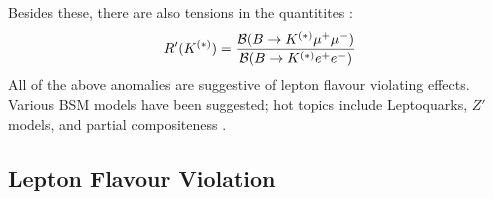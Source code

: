 \\ \\
Besides these, there are also tensions in the quantitites \cite{Altmannshofer:2017yso}:
\begin{align}
	R'(K^{(*)}) = {\mathcal{B}( B\to K^{(*)}\mu^+\mu^-)\over \mathcal{B}( B\to K^{(*)} e^+e^-)}
\end{align}
All of the above anomalies are suggestive of lepton flavour violating effects. Various BSM models have been suggested; hot topics include Leptoquarks, $Z'$ models, and partial compositeness \cite{Altmannshofer:2017yso}.

\subsection{Lepton Flavour Violation}
